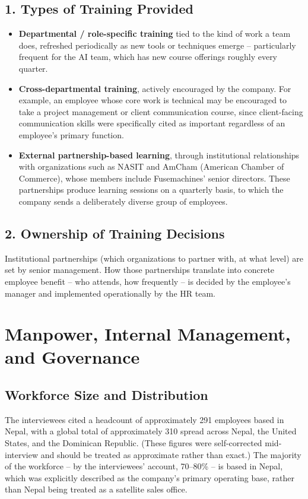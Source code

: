 \documentclass[12pt,a4paper]{report}
\begin{document}
\subsection*{1. Types of Training Provided}
\begin{itemize}[leftmargin=1.5cm]
  \item \textbf{Departmental / role-specific training} tied to the kind of work a team does, refreshed periodically as new tools or techniques emerge -- particularly frequent for the AI team, which has new course offerings roughly every quarter.
  \item \textbf{Cross-departmental training}, actively encouraged by the company. For example, an employee whose core work is technical may be encouraged to take a project management or client communication course, since client-facing communication skills were specifically cited as important regardless of an employee's primary function.
  \item \textbf{External partnership-based learning}, through institutional relationships with organizations such as NASIT and AmCham (American Chamber of Commerce), whose members include Fusemachines' senior directors. These partnerships produce learning sessions on a quarterly basis, to which the company sends a deliberately diverse group of employees.
\end{itemize}

\subsection*{2. Ownership of Training Decisions}
Institutional partnerships (which organizations to partner with, at what level) are set by senior management. How those partnerships translate into concrete employee benefit -- who attends, how frequently -- is decided by the employee's manager and implemented operationally by the HR team.

\section{Manpower, Internal Management, and Governance}

\subsection*{Workforce Size and Distribution}
The interviewees cited a headcount of approximately 291 employees based in Nepal, with a global total of approximately 310 spread across Nepal, the United States, and the Dominican Republic. (These figures were self-corrected mid-interview and should be treated as approximate rather than exact.) The majority of the workforce -- by the interviewees' account, 70--80\% -- is based in Nepal, which was explicitly described as the company's primary operating base, rather than Nepal being treated as a satellite sales office.
\end{document}

